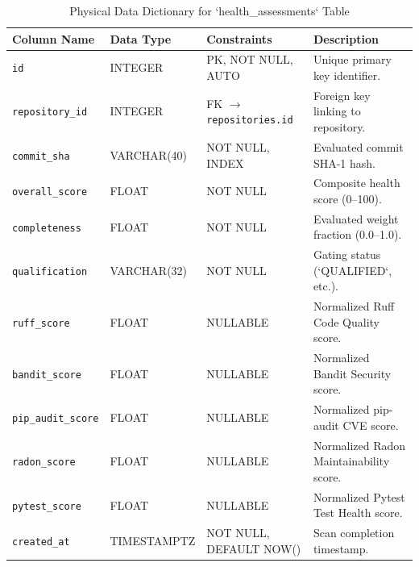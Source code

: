 \begin{table}[htbp]
    \centering
    \caption{Physical Data Dictionary for `health\_assessments` Table}
    \label{tab:app-dict-health}
    \small
    \begin{tabularx}{\textwidth}{p{} p{} p{} p{}}
        \toprule
        \textbf{Column Name} & \textbf{Data Type} & \textbf{Constraints} & \textbf{Description} \\
        \midrule
        \texttt{id} & INTEGER & PK, NOT NULL, AUTO & Unique primary key identifier. \\
        \texttt{repository\_id} & INTEGER & FK $\to$ \texttt{repositories.id} & Foreign key linking to repository. \\
        \texttt{commit\_sha} & VARCHAR(40) & NOT NULL, INDEX & Evaluated commit SHA-1 hash. \\
        \texttt{overall\_score} & FLOAT & NOT NULL & Composite health score (0--100). \\
        \texttt{completeness} & FLOAT & NOT NULL & Evaluated weight fraction (0.0--1.0). \\
        \texttt{qualification} & VARCHAR(32) & NOT NULL & Gating status (`QUALIFIED`, etc.). \\
        \texttt{ruff\_score} & FLOAT & NULLABLE & Normalized Ruff Code Quality score. \\
        \texttt{bandit\_score} & FLOAT & NULLABLE & Normalized Bandit Security score. \\
        \texttt{pip\_audit\_score} & FLOAT & NULLABLE & Normalized pip-audit CVE score. \\
        \texttt{radon\_score} & FLOAT & NULLABLE & Normalized Radon Maintainability score. \\
        \texttt{pytest\_score} & FLOAT & NULLABLE & Normalized Pytest Test Health score. \\
        \texttt{created\_at} & TIMESTAMPTZ & NOT NULL, DEFAULT NOW() & Scan completion timestamp. \\
        \bottomrule
    \end{tabularx}
\end{table}

